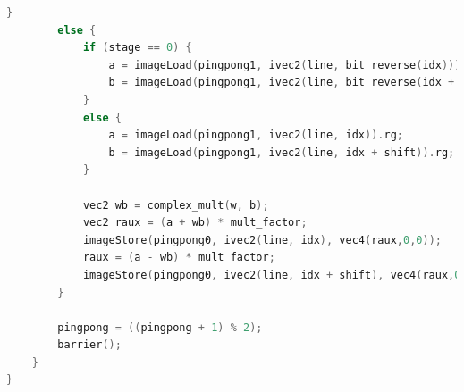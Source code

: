 \documentclass[
  oneside,
  11pt, a4paper,
  footinclude=true,
  headinclude=true,
  cleardoublepage=empty
]{scrbook}
\begin{document}
\begin{lstlisting}[language=C,caption={FFT Radix-2 Cooley-Tukey Vertical unique pass, see \autoref{subsec:all-stages-in-one-pass}},label={lst:glsl-radix2-ct-unique-vertical}]
        }
        else {
            if (stage == 0) {
                a = imageLoad(pingpong1, ivec2(line, bit_reverse(idx))).rg;
                b = imageLoad(pingpong1, ivec2(line, bit_reverse(idx + shift))).rg;
            }
            else {	
                a = imageLoad(pingpong1, ivec2(line, idx)).rg;
                b = imageLoad(pingpong1, ivec2(line, idx + shift)).rg;
            }

            vec2 wb = complex_mult(w, b);
            vec2 raux = (a + wb) * mult_factor;
            imageStore(pingpong0, ivec2(line, idx), vec4(raux,0,0));
            raux = (a - wb) * mult_factor;
            imageStore(pingpong0, ivec2(line, idx + shift), vec4(raux,0,0));
        }
        
        pingpong = ((pingpong + 1) % 2);
        barrier();
    }
}
\end{lstlisting}
\end{document}
